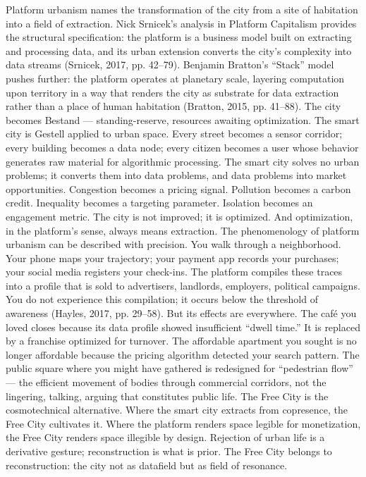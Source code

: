 Platform urbanism names the transformation of the city from a site of habitation into a field of extraction. Nick Srnicek’s analysis in Platform Capitalism provides the structural specification: the platform is a business model built on extracting and processing data, and its urban extension converts the city’s complexity into data streams (Srnicek, 2017, pp. 42–79). Benjamin Bratton’s “Stack” model pushes further: the platform operates at planetary scale, layering computation upon territory in a way that renders the city as substrate for data extraction rather than a place of human habitation (Bratton, 2015, pp. 41–88). The city becomes Bestand — standing-reserve, resources awaiting optimization. The smart city is Gestell applied to urban space. Every street becomes a sensor corridor; every building becomes a data node; every citizen becomes a user whose behavior generates raw material for algorithmic processing. The smart city solves no urban problems; it converts them into data problems, and data problems into market opportunities. Congestion becomes a pricing signal. Pollution becomes a carbon credit. Inequality becomes a targeting parameter. Isolation becomes an engagement metric. The city is not improved; it is optimized. And optimization, in the platform’s sense, always means extraction. The phenomenology of platform urbanism can be described with precision. You walk through a neighborhood. Your phone maps your trajectory; your payment app records your purchases; your social media registers your check-ins. The platform compiles these traces into a profile that is sold to advertisers, landlords, employers, political campaigns. You do not experience this compilation; it occurs below the threshold of awareness (Hayles, 2017, pp. 29–58). But its effects are everywhere. The café you loved closes because its data profile showed insufficient “dwell time.” It is replaced by a franchise optimized for turnover. The affordable apartment you sought is no longer affordable because the pricing algorithm detected your search pattern. The public square where you might have gathered is redesigned for “pedestrian flow” — the efficient movement of bodies through commercial corridors, not the lingering, talking, arguing that constitutes public life. The Free City is the cosmotechnical alternative. Where the smart city extracts from copresence, the Free City cultivates it. Where the platform renders space legible for monetization, the Free City renders space illegible by design. Rejection of urban life is a derivative gesture; reconstruction is what is prior. The Free City belongs to reconstruction: the city not as datafield but as field of resonance.

